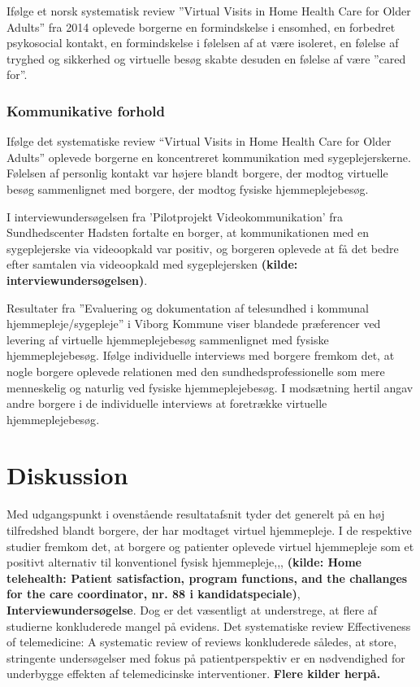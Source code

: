 Ifølge et norsk systematisk review ”Virtual Visits in Home Health Care for Older Adults” fra 2014 oplevede borgerne en formindskelse i ensomhed, en forbedret psykosocial kontakt, en formindskelse i følelsen af at være isoleret, en følelse af tryghed og sikkerhed og virtuelle besøg skabte desuden en følelse af være ”cared for”\cite{Baf2}.  

\subsubsection{Kommunikative forhold}
Ifølge det systematiske review “Virtual Visits in Home Health Care for Older Adults” oplevede borgerne en koncentreret kommunikation med sygeplejerskerne. Følelsen af personlig kontakt var højere blandt borgere, der modtog virtuelle besøg sammenlignet med borgere, der modtog fysiske hjemmeplejebesøg\cite{Baf2}. 

I interviewundersøgelsen fra ’Pilotprojekt Videokommunikation’ fra Sundhedscenter Hadsten fortalte en borger, at kommunikationen med en sygeplejerske via videoopkald var positiv, og borgeren oplevede at få det bedre efter samtalen via videoopkald med sygeplejersken \textbf{(kilde: interviewundersøgelsen)}. 

Resultater fra ”Evaluering og dokumentation af telesundhed i kommunal hjemmepleje/sygepleje” i Viborg Kommune viser blandede præferencer ved levering af virtuelle hjemmeplejebesøg sammenlignet med fysiske hjemmeplejebesøg. Ifølge individuelle interviews med borgere fremkom det, at nogle borgere oplevede relationen med den sundhedsprofessionelle som mere menneskelig og naturlig ved fysiske hjemmeplejebesøg. I modsætning hertil angav andre borgere i de individuelle interviews at foretrække virtuelle hjemmeplejebesøg\cite{kandidat}.

\section{Diskussion}
Med udgangspunkt i ovenstående resultatafsnit tyder det generelt på en høj tilfredshed blandt borgere, der har modtaget virtuel hjemmepleje. I de respektive studier fremkom det, at borgere og patienter oplevede virtuel hjemmepleje som et positivt alternativ til konventionel fysisk hjemmepleje\cite{wade},\cite{Baf2},\cite{kandidat}, \textbf{(kilde: Home telehealth: Patient satisfaction, program functions, and the challanges for the care coordinator, nr. 88 i kandidatspeciale)}, \textbf{Interviewundersøgelse}. Dog er det væsentligt at understrege, at flere af studierne konkluderede mangel på evidens. Det systematiske review Effectiveness of telemedicine: A systematic review of reviews konkluderede således, at store, stringente undersøgelser med fokus på patientperspektiv er en nødvendighed for underbygge effekten af telemedicinske interventioner\cite{Ekeland}. \textbf{Flere kilder herpå.}

